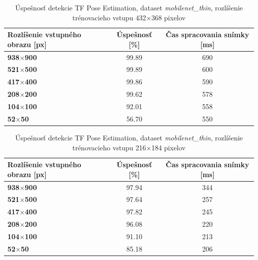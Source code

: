 \documentclass[slovak,master,dept460,male,cpp,cpdeclaration]{diploma}
\begin{document}
\begin{table}[H]
\begin{tabular}{|l|c|c|}
\hline
\textbf{Rozlíšenie vstupného obrazu [px]}        & \textbf{Úspešnosť [\%]}  & \textbf{Čas spracovania snímky [ms]} \\ \hline
\textbf{938$\times$900}      & 99.89     & 690        \\ \hline
\textbf{521$\times$500}      & 99.89     & 600     \\ \hline
\textbf{417$\times$400}      & 99.86     &  590    \\ \hline
\textbf{208$\times$200}      & 99.62     &  578    \\ \hline
\textbf{104$\times$100}      & 92.01     &  558    \\ \hline
\textbf{52$\times$50}       &  56.70     & 550     \\ \hline
\end{tabular}

	\caption{Úspešnosť detekcie TF Pose Estimation, dataset \textit{mobilenet\_thin}, rozlíšenie trénovacieho vstupu 432$\times$368 pixelov}
	\label{tab:tf1}
\end{table}


\begin{table}[H]
\begin{tabular}{|l|c|c|}
\hline
\textbf{Rozlíšenie vstupného obrazu [px]}        & \textbf{Úspešnosť [\%]}  & \textbf{Čas spracovania snímky [ms]} \\ \hline
\textbf{938$\times$900}      & 97.94     & 344     \\ \hline
\textbf{521$\times$500}      & 97.64     & 257     \\ \hline
\textbf{417$\times$400}      & 97.82     & 245     \\ \hline
\textbf{208$\times$200}      & 96.08     & 220     \\ \hline
\textbf{104$\times$100}      & 91.10     & 213     \\ \hline
\textbf{52$\times$50}       & 85.18     & 206     \\ \hline
\end{tabular}

	\caption{Úspešnosť detekcie TF Pose Estimation, dataset \textit{mobilenet\_thin}, rozlíšenie trénovacieho vstupu 216$\times$184 pixelov}
	\label{tab:tf2}
\end{table}
\end{document}
